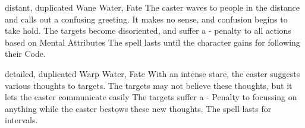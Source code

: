 \ifodd\value{diceNo}

  {distant, duplicated}%
  {Wane}%
  {Water, Fate}%
  {}%
  {
    The caster waves to people in the distance and calls out a confusing greeting.
    It makes no sense, and confusion begins to take hold.
    The targets become disoriented, and suffer a - penalty to all actions based on Mental Attributes}%
  {
    The spell lasts until the character gains  for following their Code.
  }

\else

  {detailed, duplicated}%
  {Warp}%
  {Water, Fate}%
  {}%
  {With an intense stare, the caster suggests various thoughts to  targets.
  The targets may not believe these thoughts, but it lets the caster communicate easily}%
  {The targets suffer a - Penalty to focussing on anything while the caster bestows these new thoughts.
  The spell lasts for  \glspl{interval}.}

\fi
{}
